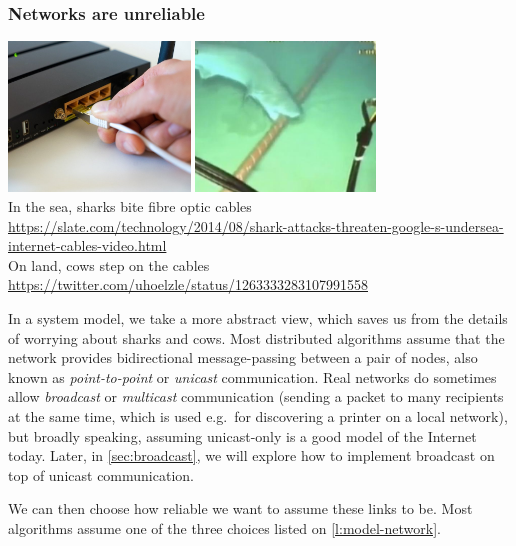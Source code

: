 \begin{frame}
    \label{s:shark-bite}
    \frametitle{Networks are unreliable}
    \includegraphics[height=4cm]{images/network-cable.jpg}
    \includegraphics[height=4cm]{images/shark-bite.jpg}\\[1em]
    In the sea, sharks bite fibre optic cables \\
    {\scriptsize\url{https://slate.com/technology/2014/08/shark-attacks-threaten-google-s-undersea-internet-cables-video.html}}\\[1em]
    On land, cows step on the cables \\
    {\scriptsize\url{https://twitter.com/uhoelzle/status/1263333283107991558}}
\end{frame}
\label{l:shark-bite}

In a system model, we take a more abstract view, which saves us from the details of worrying about sharks and cows.
Most distributed algorithms assume that the network provides bidirectional message-passing between a pair of nodes, also known as \emph{point-to-point} or \emph{unicast} communication.
Real networks do sometimes allow \emph{broadcast} or \emph{multicast} communication (sending a packet to many recipients at the same time, which is used e.g.\ for discovering a printer on a local network), but broadly speaking, assuming unicast-only is a good model of the Internet today.
Later, in \autoref{sec:broadcast}, we will explore how to implement broadcast on top of unicast communication.

We can then choose how reliable we want to assume these links to be.
Most algorithms assume one of the three choices listed on \autoref{l:model-network}.

